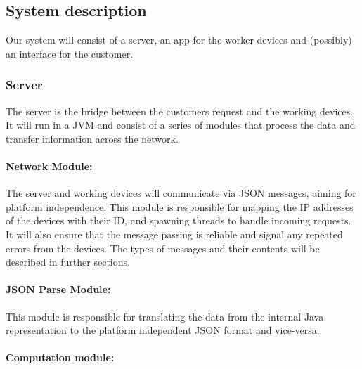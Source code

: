 \documentclass[a4paper,10pt]{article}
\begin{document}
\subsection{System description}

Our system will consist of a server, an app for the worker devices and (possibly) an interface for the customer.

\subsubsection{Server}
The server is the bridge between the customers request and the working devices. It will run in a JVM and consist of a series of modules that process the data and transfer information across the network.

\paragraph{Network Module:}

The server and working devices will communicate via JSON messages, aiming for platform independence. This module is responsible for mapping the IP addresses of the devices with their ID, and spawning threads to handle incoming requests. It will also ensure that the message passing is reliable and signal any repeated errors from the devices. The types of messages and their contents will be described in further sections.

\paragraph{JSON Parse Module:}

This module is responsible for translating the data from the internal Java representation to the platform independent JSON format and vice-versa. 

%

\paragraph{Computation module:}
\end{document}
